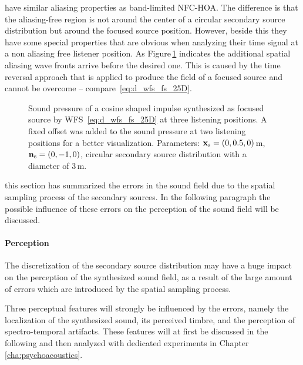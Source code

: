  have similar aliasing properties as band-limited
\ac{NFC-HOA}. The difference is that the aliasing-free region is not around
the center of a circular secondary source distribution but around the
focused source position.
However, beside this they have some special properties that are obvious when
analyzing their time signal at a non aliasing free listener position. As
Figure\,\ref{fig:sound_field_imp_fixed_fs} indicates the additional
spatial aliasing wave fronts arrive before the desired one. This
is caused by the
time reversal approach\autocite{Yon2003} that is applied to produce the field
of a focused source and cannot be overcome -- compare~\eqref{eq:d_wfs_fs_25D}.
%
\begin{figure}[t]
    \small
    
    \caption{Sound pressure of a cosine shaped impulse synthesized as focused
    source by \ac{WFS}~\protect\eqref{eq:d_wfs_fs_25D} at three listening
    positions. A fixed offset was added to the sound pressure at two listening
    positions for a better visualization.
    Parameters: $\mathbf{x}_\text{s} = (0,0.5,0)$\,m, $\mathbf{n}_\text{s} = (0,-1,0)$, circular
    secondary source distribution with a diameter of $3$\,m.
    }
    \label{fig:sound_field_imp_fixed_fs}
\end{figure}

 this section has summarized the errors in the sound field due
to the spatial sampling process of the secondary sources. In the following paragraph
the possible influence of these errors on the perception of the sound field will be
discussed.


\paragraph{Perception}
%
The discretization of the secondary source distribution may have a huge impact
on the perception of the synthesized sound field, as a result of the large amount
of errors which are introduced by the spatial sampling process.

Three perceptual features will strongly be influenced by the errors,
namely the localization of the synthesized sound, its perceived
timbre, and the perception of spectro-temporal artifacts.
These features will at first be discussed in the following and then analyzed
with dedicated experiments in Chapter\,\ref{cha:psychoacoustics}.

